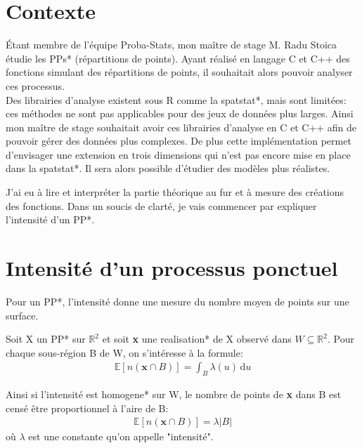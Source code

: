 \documentclass[stage2a]{tnreport}
\begin{document}
\section{Contexte} 

Étant membre de l'équipe Proba-Stats, mon maître de stage M. Radu Stoica étudie les \gls{PP}s* (répartitions de points). Ayant réalisé en langage C et C++ des fonctions simulant des répartitions de points, il souhaitait alors pouvoir analyser ces processus.\\

Des librairies d'analyse existent sous R comme la \gls{spatstat}*, mais sont limitées: ces méthodes ne sont pas applicables pour des jeux de données plus larges. Ainsi mon maître de stage souhaitait avoir ces librairies d'analyse en C et C++ afin de pouvoir gérer des données plus complexes. De plus cette implémentation permet d'envisager une extension en trois dimensions qui n'est pas encore mise en place dans la \gls{spatstat}*. Il sera alors possible d'étudier des modèles plus réalistes.

J'ai eu à lire et interpréter la partie théorique au fur et à mesure des créations des fonctions. Dans un soucis de clarté, je vais commencer par expliquer l'intensité d'un \gls{PP}*. 


\section{Intensité d'un processus ponctuel}

Pour un \gls{PP}*, l'intensité donne une mesure du nombre moyen de points sur une surface.

Soit X un \gls{PP}* sur \begin{math} \mathbb{R}^2\end{math} et soit \textbf{x} une \gls{realisation}* de X observé dans \begin{math} W \subseteq \mathbb{R}^2\end{math}. Pour chaque sous-région B de W, on s'intéresse à la formule:
\begin{align*}
    \mathbb{E}[n(\textbf{x} \cap B)] = \int_B \lambda(u) \, \mathrm du
\end{align*}

Ainsi si l'intensité est \gls{homogene}* sur W, le nombre de points de \textbf{x} dans B est censé être proportionnel à l'aire de B:
\begin{align*}
    \mathbb{E}[n(\textbf{x} \cap B)] = \lambda |B|
\end{align*}
où \begin{math}\lambda\end{math} est une constante qu'on appelle "intensité".
\end{document}
